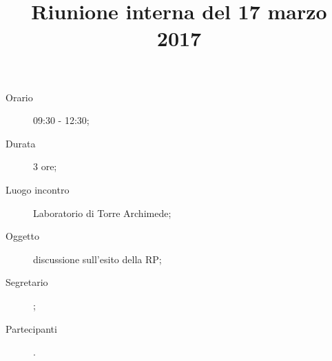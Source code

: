 


\author{\GG}
\supervisor{\LB}
\dest{\ALL}
\title{Riunione interna del 17 marzo 2017}



\maketitle

\begin{description}
	\item[Orario] 09:30 - 12:30;
	\item[Durata] 3 ore;
	\item[Luogo incontro] Laboratorio di Torre Archimede;
	\item[Oggetto] discussione sull'esito della RP;
	\item[Segretario] \AZ; 
	\item[Partecipanti] \ALL.
\end{description}


